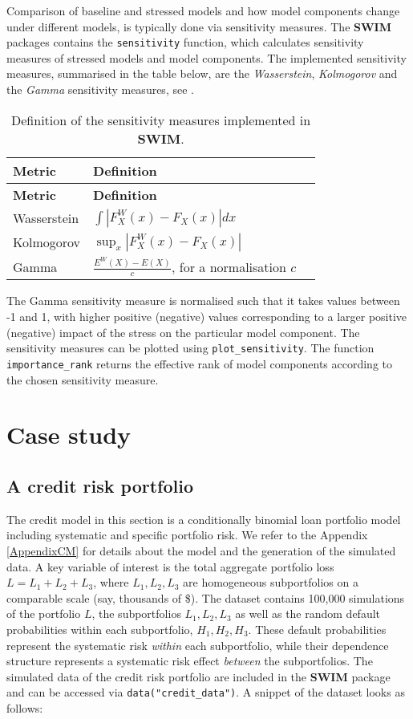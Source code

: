 \documentclass[
]{article}
\begin{document}
Comparison of baseline and stressed models and how model components change under different models, is typically done via sensitivity measures. The \textbf{SWIM} packages contains the \texttt{sensitivity} function, which calculates sensitivity measures of stressed models and model components. The implemented sensitivity measures, summarised in the table below, are the \emph{Wasserstein}, \emph{Kolmogorov} and the \emph{Gamma} sensitivity measures, see \citet{Pesenti2016DM} \citet{Pesenti2019} \citet{Emmer2015JR}.

\begin{longtable}[]{@{}lll@{}}
\caption{\label{tab:sensitivity} Definition of the sensitivity measures implemented in \textbf{SWIM}.}\tabularnewline
\toprule
\textbf{Metric} & \textbf{Definition} &\tabularnewline
\midrule
\endfirsthead
\toprule
\textbf{Metric} & \textbf{Definition} &\tabularnewline
\midrule
\endhead
Wasserstein & \(\int | F^W_X (x) - F_X(x)| dx\) &\tabularnewline
Kolmogorov & \(\sup_x |F^W_X (x) - F_X(x)|\) &\tabularnewline
Gamma & \(\frac{E^W(X) - E(X)}{c}\), for a normalisation \(c\) &\tabularnewline
\bottomrule
\end{longtable}

The Gamma sensitivity measure is normalised such that it takes values between -1 and 1, with higher positive (negative) values corresponding to a larger positive (negative) impact of the stress on the particular model component. The sensitivity measures can be plotted using \texttt{plot\_sensitivity}. The function \texttt{importance\_rank} returns the effective rank of model components according to the chosen sensitivity measure.

\hypertarget{Sec:CreditModel}{%
\section{Case study}\label{Sec:CreditModel}}

\hypertarget{a-credit-risk-portfolio}{%
\subsection{A credit risk portfolio}\label{a-credit-risk-portfolio}}

The credit model in this section is a conditionally binomial loan portfolio model including systematic and specific portfolio risk. We refer to the Appendix \ref{AppendixCM} for details about the model and the generation of the simulated data. A key variable of interest is the total aggregate portfolio loss \(L = L_1 + L_2 + L_3\), where \(L_1, L_2, L_3\) are homogeneous subportfolios on a comparable scale (say, thousands of \$). The dataset contains 100,000 simulations of the portfolio \(L\), the subportfolios \(L_1, L_2, L_3\) as well as the random default probabilities within each subportfolio, \(H_1, H_2, H_3\). These default probabilities represent the systematic risk \emph{within} each subportfolio, while their dependence structure represents a systematic risk effect \emph{between} the subportfolios. The simulated data of the credit risk portfolio are included in the \textbf{SWIM} package and can be accessed via \texttt{data("credit\_data")}. A snippet of the dataset looks as follows:
\end{document}
